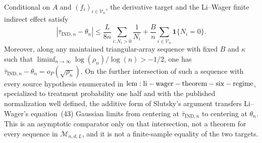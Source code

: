 Conditional on \(A\) and \((f_i)_{i\in\mathcal V_n}\), the derivative target and the Li--Wager finite indirect effect satisfy
\[
 \left|\bar\tau_{\mathrm{IND},n}-\theta_n\right|
 \le \frac{L}{8n}\sum_{i:N_i>0}\frac{1}{N_i}
 +\frac{B}{n}\sum_{i\in\mathcal V_n}\mathbf 1\{N_i=0\}.
\]
Moreover, along any maintained triangular-array sequence with fixed \(B\) and \(\kappa\) such that \(\liminf_{n\to\infty}\log(\rho_n)/\log(n)>-1/2\), one has \(\bar\tau_{\mathrm{IND},n}-\theta_n=o_P(\sqrt{\rho_n})\). On the further intersection of such a sequence with every source hypothesis enumerated in \({\rm lem:li-wager-theorem-six-regime}\), specialized to treatment probability one half and with the published normalization well defined, the additive form of Slutsky's argument transfers Li--Wager's equation~(43) Gaussian limits from centering at \(\bar\tau_{\mathrm{IND},n}\) to centering at \(\theta_n\). This is an asymptotic comparator only on that intersection, not a theorem for every sequence in \(\mathcal M_{n,d,L}\), and it is not a finite-sample equality of the two targets.